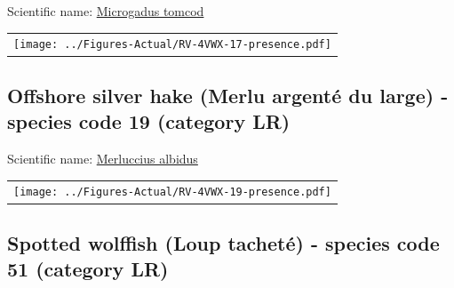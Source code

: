 \documentclass[12pt]{article}\usepackage[]{graphicx}\usepackage[]{color}
\begin{document}

Scientific name: \href{http://www.marinespecies.org/aphia.php?p=taxdetails\&id=158928}{Microgadus tomcod} \newline
\begin{minipage}{1.0\textwidth}
 \begin{tabular}{c}
\texttt{[image: ../Figures-Actual/RV-4VWX-17-presence.pdf]} \\ 
\end{tabular} 
\end{minipage}
\clearpage

\renewcommand\thefigure{\thesubsection\Alph{figure}}

\setcounter{figure}{0}

\hypertarget{sec:19}{%
\subsection{Offshore silver hake (Merlu argenté du large) - species code 19 (category LR)}\label{sec:19}}

  


Scientific name: \href{http://www.marinespecies.org/aphia.php?p=taxdetails\&id=158748}{Merluccius albidus} \newline
\begin{minipage}{1.0\textwidth}
 \begin{tabular}{c}
\texttt{[image: ../Figures-Actual/RV-4VWX-19-presence.pdf]} \\ 
\end{tabular} 
\end{minipage}
\clearpage

\renewcommand\thefigure{\thesubsection\Alph{figure}}

\setcounter{figure}{0}

\hypertarget{sec:51}{%
\subsection{Spotted wolffish (Loup tacheté) - species code 51 (category LR)}\label{sec:51}}

  

\end{document}
